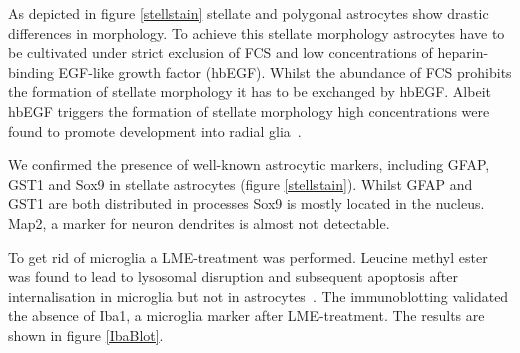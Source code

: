 \documentclass[a4paper,11pt,bibtotocnumbered]{article}
\begin{document}
As depicted in figure \ref{stellstain} stellate and polygonal astrocytes show drastic differences in morphology. To achieve this stellate morphology astrocytes have to be cultivated under strict exclusion of FCS and low concentrations of heparin-binding EGF-like growth factor (hbEGF). Whilst the abundance of FCS prohibits the formation of stellate morphology it has to be exchanged by hbEGF. Albeit hbEGF triggers the formation of stellate morphology high concentrations were found to promote development into radial glia~\cite{Wolfes2017}.  


We confirmed the presence of well-known astrocytic markers, including GFAP, GST1 and Sox9 in stellate astrocytes (figure \ref{stellstain}). Whilst GFAP and GST1 are both distributed in processes Sox9 is mostly located in the nucleus. Map2, a marker for neuron dendrites is almost not detectable.





 


To get rid of microglia a LME-treatment was performed. Leucine methyl ester was found to lead to lysosomal disruption and subsequent apoptosis after internalisation in microglia but not in astrocytes~\cite{Jebelli2015}. The immunoblotting validated the absence of Iba1, a microglia marker after LME-treatment. The results are shown in figure \ref{IbaBlot}.
 

\end{document}
